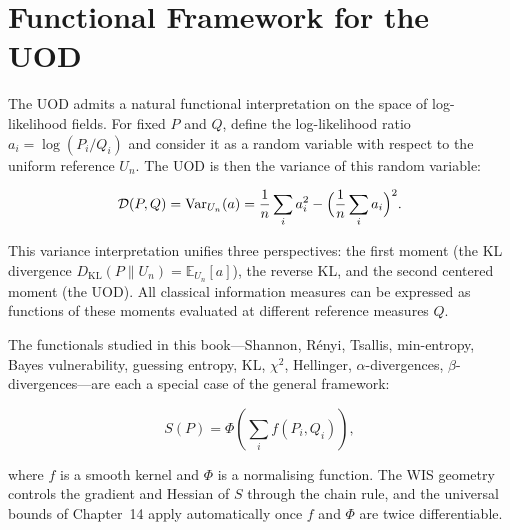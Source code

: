 \chapter[Functional Framework]{Functional Framework for the UOD}

The UOD admits a natural functional interpretation on the space of
log-likelihood fields.  For fixed $P$ and $Q$, define the
log-likelihood ratio $a_i = \log(P_i/Q_i)$ and consider it as a random
variable with respect to the uniform reference $U_n$.  The UOD is then
the variance of this random variable:

\[
\mathcal D(P,Q) = \operatorname{Var}_{U_n}(a) = \frac1n\sum_i a_i^2 - \Bigl(\frac1n\sum_i a_i\Bigr)^2.
\]

This variance interpretation unifies three perspectives: the first
moment (the KL divergence $D_{\mathrm{KL}}(P\|U_n) = \mathbb E_{U_n}[a]$),
the reverse KL, and the second centered moment (the UOD).  All classical
information measures can be expressed as functions of these moments
evaluated at different reference measures $Q$.

The functionals studied in this book---Shannon, R\'enyi, Tsallis,
min-entropy, Bayes vulnerability, guessing entropy, KL, $\chi^2$,
Hellinger, $\alpha$-divergences, $\beta$-divergences---are each a
special case of the general framework:

\[
S(P) = \Phi\!\left(\sum_i f(P_i, Q_i)\right),
\]

where $f$ is a smooth kernel and $\Phi$ is a normalising function.
The WIS geometry controls the gradient and Hessian of $S$ through
the chain rule, and the universal bounds of Chapter~14 apply
automatically once $f$ and $\Phi$ are twice differentiable.